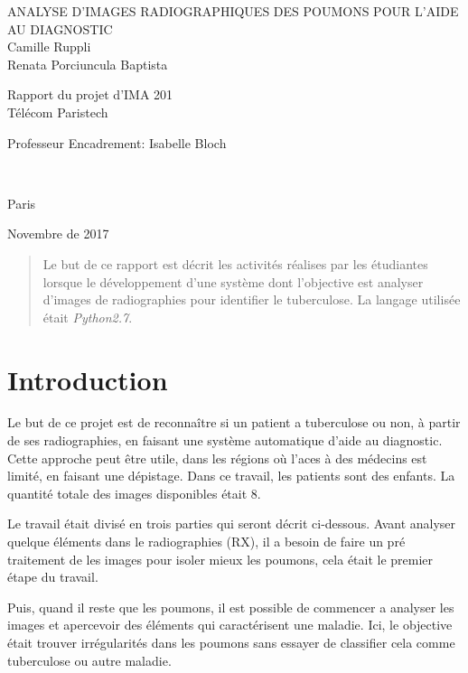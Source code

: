 \documentclass[a4paper,12pt]{report}
\begin{document}
\begin{center}
	\large{ANALYSE D'IMAGES RADIOGRAPHIQUES DES POUMONS POUR L'AIDE AU DIAGNOSTIC}\\
	\vspace{2cm}
	\large{Camille Ruppli \\Renata Porciuncula Baptista}\\
\end{center}
\vspace{3cm}
\hspace{7cm}
\hfill \parbox{8.0cm}{Rapport du projet d'IMA 201\\Télécom Paristech\\}
\vspace{2cm}
\hfill \parbox{8.0cm}{Professeur Encadrement: Isabelle Bloch} \\
\vspace{2cm}
\begin{center}
	Paris
	
	Novembre de 2017
\end{center}

\tableofcontents
\begin{abstract}
	Le but de ce rapport est décrit les activités réalises par les étudiantes lorsque le développement d'une système dont l'objective est analyser d'images de radiographies pour identifier le tuberculose. La langage utilisée était \textit{Python2.7}.   
\end{abstract}

\chapter {Introduction}
Le but de ce projet est de reconnaître si un patient a tuberculose ou non, à partir de ses radiographies, en faisant une système automatique d'aide au diagnostic. Cette approche peut être utile, dans les régions où l'aces à des médecins est limité, en faisant une dépistage. Dans ce travail, les patients sont des enfants. La quantité totale des images disponibles était 8.

Le travail était divisé en trois parties qui seront décrit ci-dessous. Avant analyser quelque éléments dans le radiographies (RX), il a besoin de faire un pré traitement de les images pour isoler mieux les poumons, cela était le premier étape du travail.

Puis, quand il reste que les poumons, il est possible de commencer a analyser les images et apercevoir des éléments qui caractérisent une maladie. Ici, le objective était trouver irrégularités dans les poumons sans essayer de classifier cela comme tuberculose ou autre maladie.
\end{document}
